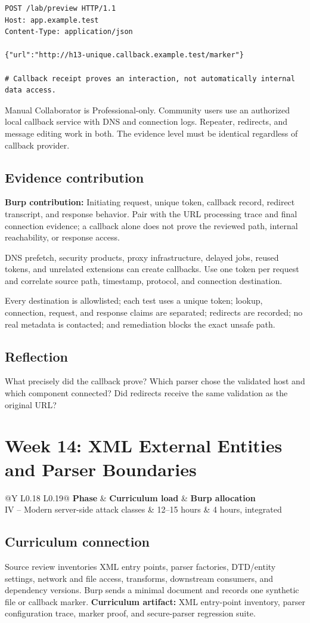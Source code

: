 \documentclass[11pt]{article}
\makeatletter
\newcommand{\weekheader}[5]{%
  \clearpage
  \section{Week #1: #2}
  \begin{tcolorbox}[colback=Navy,colframe=Navy,coltext=white]
    \begin{tabularx}{\linewidth}{@{}Y L{0.18\linewidth} L{0.19\linewidth}@{}}
      \textbf{Phase} & \textbf{Curriculum load} & \textbf{Burp allocation}\\
      #3 & #4 hours & #5 hours, integrated
    \end{tabularx}
  \end{tcolorbox}
}
\newcommand{\weekfield}[2]{%
  \Needspace{5\baselineskip}
  \subsection*{#1}
  #2
}
\newcommand{\curriculumartifact}[1]{\textbf{Curriculum artifact:} #1}
\newcommand{\burpevidence}[1]{\textbf{Burp contribution:} #1}
\makeatother
\begin{document}
\begin{lstlisting}[caption={Unique callback marker for an SSRF hypothesis}]
POST /lab/preview HTTP/1.1
Host: app.example.test
Content-Type: application/json

{"url":"http://h13-unique.callback.example.test/marker"}

# Callback receipt proves an interaction, not automatically internal data access.
\end{lstlisting}

\begin{editionbox}
Manual Collaborator is Professional-only. Community users use an authorized local
callback service with DNS and connection logs. Repeater, redirects, and message
editing work in both. The evidence level must be identical regardless of callback
provider.
\end{editionbox}

\weekfield{Evidence contribution}{\burpevidence{Initiating request, unique token,
callback record, redirect transcript, and response behavior.} Pair with the URL
processing trace and final connection evidence; a callback alone does not prove
the reviewed path, internal reachability, or response access.}

\begin{troubleshootingbox}
DNS prefetch, security products, proxy infrastructure, delayed jobs, reused tokens,
and unrelated extensions can create callbacks. Use one token per request and
correlate source path, timestamp, protocol, and connection destination.
\end{troubleshootingbox}

\begin{checkpoints}
Every destination is allowlisted; each test uses a unique token; lookup,
connection, request, and response claims are separated; redirects are recorded;
no real metadata is contacted; and remediation blocks the exact unsafe path.
\end{checkpoints}

\weekfield{Reflection}{What precisely did the callback prove? Which parser chose
the validated host and which component connected? Did redirects receive the same
validation as the original URL?}

\weekheader{14}{XML External Entities and Parser Boundaries}{IV -- Modern server-side attack classes}{12--15}{4}

\weekfield{Curriculum connection}{Source review inventories XML entry points,
parser factories, DTD/entity settings, network and file access, transforms,
downstream consumers, and dependency versions. Burp sends a minimal document and
records one synthetic file or callback marker. \curriculumartifact{XML entry-point
inventory, parser configuration trace, marker proof, and secure-parser regression suite.}}
\end{document}
